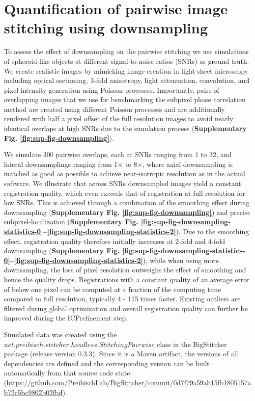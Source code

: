 \section{Quantification of pairwise image stitching using downsampling}
\label{sec:quantPCM}

To assess the effect of downsampling on the pairwise stitching we use simulations of spheroid-like objects at different signal-to-noise ratios (SNRs) as ground truth. We create realistic images by mimicking image creation in light-sheet microscopy including optical sectioning, 3-fold anisotropy, light attenuation, convolution, and pixel intensity generation using Poisson processes\cite{mvdecon}. Importantly, pairs of overlapping images that we use for benchmarking the subpixel phase correlation method are created using different Poisson processes and are additionally rendered with half a pixel offset of the full resolution images to avoid nearly identical overlaps at high SNRs due to the simulation process (\textbf{Supplementary Fig. \ref{fig:sup-fig-downsampling}}).

We simulate 300 pairwise overlaps, each at SNRs ranging from 1 to 32, and lateral downsamplings ranging from 1$\times$ to 8$\times$, where axial downsampling is matched as good as possible to achieve near-isotropic resolution as in the actual software. We illustrate that across SNRs downsampled images yield a constant registration quality, which even exceeds that of registration at full resolution for low SNRs. This is achieved through a combination of the smoothing effect during downsampling (\textbf{Supplementary Fig. \ref{fig:sup-fig-downsampling}}) and precise subpixel-localization (\textbf{Supplementary Fig. \ref{fig:sup-fig-downsampling-statistics-0}--\ref{fig:sup-fig-downsampling-statistics-2}}). Due to the smoothing effect, registration quality therefore initially increases at 2-fold and 4-fold downsampling (\textbf{Supplementary Fig. \ref{fig:sup-fig-downsampling-statistics-0}--\ref{fig:sup-fig-downsampling-statistics-2}}), while when using more downsampling, the loss of pixel resolution outweighs the effect of smoothing and hence the quality drops. Registrations with a constant quality of an average error of below one pixel can be computed at a fraction of the computing time compared to full resolution, typically 4 - 115 times faster. Existing outliers are filtered during global optimization and overall registration quality can further be improved during the ICP\cite{icp }refinement step.

Simulated data was created using the $net.preibisch.stitcher.headless.StitchingPairwise$ class in the BigStitcher package (release version 0.3.3). Since it is a Maven artifact, the versions of all dependencies are defined and the corresponding version can be built automatically from that source code state \small(\url{https://github.com/PreibischLab/BigStitcher/commit/0d7f79a59ab15fb1805157ab72c5bc9802b02fbd}).


